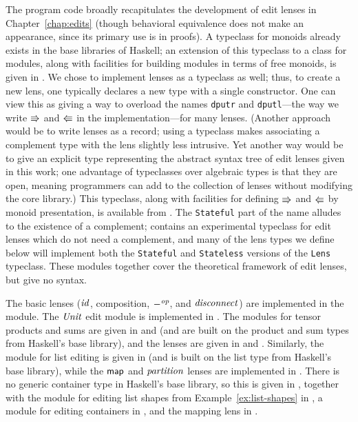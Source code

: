 The program code broadly recapitulates the development of edit lenses in
Chapter~\ref{chap:edits} (though behavioral equivalence does not make an
appearance, since its primary use is in proofs). A typeclass for monoids
already exists in the base libraries of Haskell; an extension of this
typeclass to a class for modules, along with facilities for building modules
in terms of free monoids, is given in . We chose
to implement lenses as a typeclass as well; thus, to create a new lens, one
typically declares a new type with a single constructor. One can view this
as giving a way to overload the names \texttt{dputr} and
\texttt{dputl}---the way we write $\mathord{\Rrightarrow}$ and $\mathord{\Lleftarrow}$ in the
implementation---for many lenses. (Another approach would be to write lenses
as a record; using a typeclass makes associating a complement type with the
lens slightly less intrusive. Yet another way would be to give an explicit
type representing the abstract syntax tree of edit lenses given in this
work; one advantage of typeclasses over algebraic types is that they are
open, meaning programmers can add to the collection of lenses without
modifying the core library.) This typeclass, along with facilities for
defining $\mathord{\Rrightarrow}$ and $\mathord{\Lleftarrow}$ by monoid presentation, is available from
. The \texttt{Stateful} part of the name
alludes to the existence of a complement; 
contains an experimental typeclass for edit lenses which do not need a
complement, and many of the lens types we define below will implement both
the \texttt{Stateful} and \texttt{Stateless} versions of the \texttt{Lens}
typeclass. These modules together cover the theoretical framework of edit
lenses, but give no syntax.

The basic lenses ($\mathit{id}$, composition, $-^\mathit{op}$, and $\mathit{disconnect}$) are
implemented in the  module. The $\mathit{Unit}$
edit module is implemented in . The modules
for tensor products and sums are given in  and
 (and are built on the product and sum types from
Haskell's base library), and the lenses are given in
 and . Similarly,
the module for list editing is given in  (and is
built on the list type from Haskell's base library), while the $\mathsf{map}$ and
$\mathit{partition}$ lenses are implemented in . There
is no generic container type in Haskell's base library, so this is given in
, together with the module for editing list shapes
from Example~\ref{ex:list-shapes} in , a module
for editing containers in , and the mapping
lens in .

